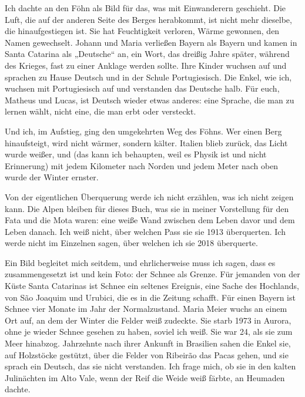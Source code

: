 \documentclass[
  ngerman,
  11pt,
  openany]{book}
\begin{document}
Ich dachte an den Föhn als Bild für das, was mit Einwanderern geschieht.
Die Luft, die auf der anderen Seite des Berges herabkommt, ist nicht
mehr dieselbe, die hinaufgestiegen ist. Sie hat Feuchtigkeit verloren,
Wärme gewonnen, den Namen gewechselt. Johann und Maria verließen Bayern
als Bayern und kamen in Santa Catarina als „Deutsche`` an, ein Wort, das
dreißig Jahre später, während des Krieges, fast zu einer Anklage werden
sollte. Ihre Kinder wuchsen auf und sprachen zu Hause Deutsch und in der
Schule Portugiesisch. Die Enkel, wie ich, wuchsen mit Portugiesisch auf
und verstanden das Deutsche halb. Für euch, Matheus und Lucas, ist
Deutsch wieder etwas anderes: eine Sprache, die man zu lernen wählt,
nicht eine, die man erbt oder versteckt.

Und ich, im Aufstieg, ging den umgekehrten Weg des Föhns. Wer einen Berg
hinaufsteigt, wird nicht wärmer, sondern kälter. Italien blieb zurück,
das Licht wurde weißer, und (das kann ich behaupten, weil es Physik ist
und nicht Erinnerung) mit jedem Kilometer nach Norden und jedem Meter
nach oben wurde der Winter ernster.

Von der eigentlichen Überquerung werde ich nicht erzählen, was ich nicht
zeigen kann. Die Alpen bleiben für dieses Buch, was sie in meiner
Vorstellung für den Fata und die Mota waren: eine weiße Wand zwischen
dem Leben davor und dem Leben danach. Ich weiß nicht, über welchen Pass
sie sie 1913 überquerten. Ich werde nicht im Einzelnen sagen, über
welchen ich sie 2018 überquerte.

Ein Bild begleitet mich seitdem, und ehrlicherweise muss ich sagen, dass
es zusammengesetzt ist und kein Foto: der Schnee als Grenze. Für
jemanden von der Küste Santa Catarinas ist Schnee ein seltenes Ereignis,
eine Sache des Hochlands, von São Joaquim und Urubici, die es in die
Zeitung schafft. Für einen Bayern ist Schnee vier Monate im Jahr der
Normalzustand. Maria Meier wuchs an einem Ort auf, an dem der Winter die
Felder weiß zudeckte. Sie starb 1973 in Aurora, ohne je wieder Schnee
gesehen zu haben, soviel ich weiß. Sie war 24, als sie zum Meer
hinabzog. Jahrzehnte nach ihrer Ankunft in Brasilien sahen die Enkel
sie, auf Holzstöcke gestützt, über die Felder von Ribeirão das Pacas
gehen, und sie sprach ein Deutsch, das sie nicht verstanden. Ich frage
mich, ob sie in den kalten Julinächten im Alto Vale, wenn der Reif die
Weide weiß färbte, an Heumaden dachte.
\end{document}
